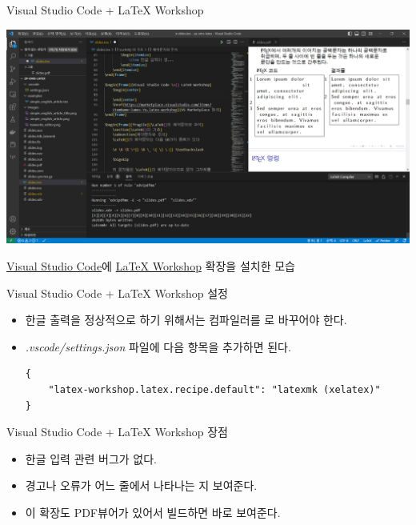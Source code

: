 \documentclass{beamer}
\begin{document}
\begin{frame}{Visual Studio Code + LaTeX Workshop}
    \begin{center}
        \includegraphics[scale=0.25]{images/vscode.png}
    \end{center}
    \href{https://code.visualstudio.com/}{Visual Studio Code}에 \href{https://marketplace.visualstudio.com/items?itemName=James-Yu.latex-workshop}{LaTeX Workshop} 확장을 설치한 모습
\end{frame}

\begin{frame}[fragile]{Visual Studio Code + LaTeX Workshop 설정}
    \begin{itemize}
        \item 한글 출력을 정상적으로 하기 위해서는 컴파일러를 \XeLaTeX{}로 바꾸어야 한다.
        \item \emph{.vscode/settings.json} 파일에 다음 항목을 추가하면 된다.
        \begin{lstlisting}[language={}]
{
    "latex-workshop.latex.recipe.default": "latexmk (xelatex)"
}
        \end{lstlisting}
    \end{itemize}
\end{frame}

\begin{frame}{Visual Studio Code + LaTeX Workshop 장점}
    \begin{itemize}
        \item 한글 입력 관련 버그가 없다.
        \item 경고나 오류가 어느 줄에서 나타나는 지 보여준다.
        \item 이 확장도 PDF뷰어가 있어서 빌드하면 바로 보여준다.
    \end{itemize}
\end{frame}
\end{document}
